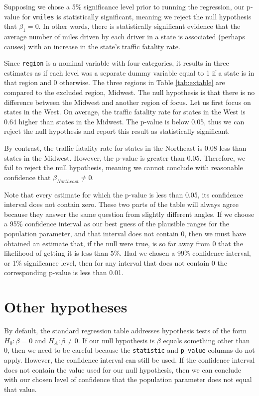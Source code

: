 \documentclass[
]{book}
\begin{document}
Supposing we chose a 5\% significance level prior to running the regression, our p-value for \texttt{vmiles} is statistically significant, meaning we reject the null hypothesis that \(\beta_1=0\). In other words, there is statistically significant evidence that the average number of miles driven by each driver in a state is associated (perhaps causes) with an increase in the state's traffic fatality rate.

Since \texttt{region} is a nominal variable with four categories, it results in three estimates as if each level was a separate dummy variable equal to 1 if a state is in that region and 0 otherwise. The three regions in Table \ref{tab:extable} are compared to the excluded region, Midwest. The null hypothesis is that there is no difference between the Midwest and another region of focus. Let us first focus on states in the West. On average, the traffic fatality rate for states in the West is 0.64 higher than states in the Midwest. The p-value is below 0.05, thus we can reject the null hypothesis and report this result as statistically significant.

By contrast, the traffic fatality rate for states in the Northeast is 0.08 less than states in the Midwest. However, the p-value is greater than 0.05. Therefore, we fail to reject the null hypothesis, meaning we cannot conclude with reasonable confidence that \(\beta_{Northeast} \neq 0\).

Note that every estimate for which the p-value is less than 0.05, its confidence interval does not contain zero. These two parts of the table will always agree because they answer the same question from slightly different angles. If we choose a 95\% confidence interval as our best guess of the plausible ranges for the population parameter, and that interval does not contain 0, then we must have obtained an estimate that, if the null were true, is so far away from 0 that the likelihood of getting it is less than 5\%. Had we chosen a 99\% confidence interval, or 1\% significance level, then for any interval that does not contain 0 the corresponding p-value is less than 0.01.

\hypertarget{other-hypotheses}{%
\section{Other hypotheses}\label{other-hypotheses}}

By default, the standard regression table addresses hypothesis tests of the form \(H_0: \beta=0\) and \(H_A: \beta \neq 0\). If our null hypothesis is \(\beta\) equals something other than 0, then we need to be careful because the \texttt{statistic} and \texttt{p\_value} columns do not apply. However, the confidence interval can still be used. If the confidence interval does not contain the value used for our null hypothesis, then we can conclude with our chosen level of confidence that the population parameter does not equal that value.
\end{document}
